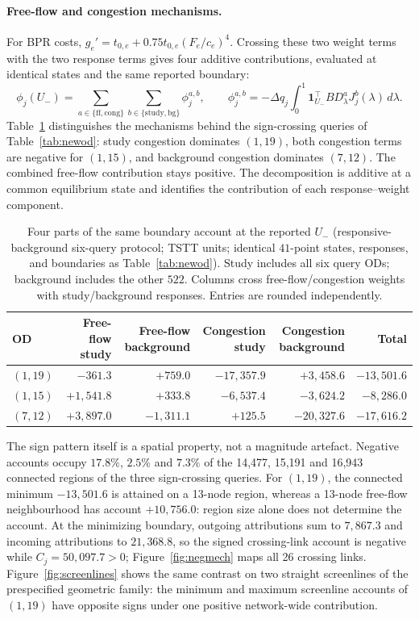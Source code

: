 \paragraph{Free-flow and congestion mechanisms.}\label{subsec:newod}
For BPR costs, $g_e'=t_{0,e}+0.75t_{0,e}(F_e/c_e)^4$. Crossing these two weight terms with the two response terms gives four additive contributions, evaluated at identical states and the same reported boundary:
\[
\phi_j(U_-)=\sum_{a\in\{\mathrm{ff,cong}\}}\sum_{b\in\{\mathrm{study,bg}\}}\phi_j^{a,b},
\qquad \phi_j^{a,b}=-\Delta q_j\int_0^1\mathbf1_{U_-}^{\top}BD_\lambda^aJ_j^b(\lambda)\,d\lambda.
\]
Table~\ref{tab:ffcong} distinguishes the mechanisms behind the sign-crossing queries of Table~\ref{tab:newod}: study congestion dominates $(1,19)$, both congestion terms are negative for $(1,15)$, and background congestion dominates $(7,12)$. The combined free-flow contribution stays positive. The decomposition is additive at a common equilibrium state and identifies the contribution of each response--weight component.
\begin{table}[pos=htbp]
\caption{Four parts of the same boundary account at the reported
$U_-$ (responsive-background six-query protocol; TSTT units; identical $41$-point
states, responses, and boundaries as Table~\ref{tab:newod}). Study
includes all six query ODs; background includes the other $522$.
Columns cross free-flow/congestion weights with study/background
responses. Entries are rounded independently.}\label{tab:ffcong}
\small
\begin{tabular*}{\tblwidth}{@{\extracolsep{\fill}}lrrrrr}
\toprule
OD & Free-flow study & Free-flow background & Congestion study & Congestion background & Total\\
\midrule
$(1,19)$ & $-361.3$ & $+759.0$ & $-17{,}357.9$ & $+3{,}458.6$ & $-13{,}501.6$ \\
$(1,15)$ & $+1{,}541.8$ & $+333.8$ & $-6{,}537.4$ & $-3{,}624.2$ & $-8{,}286.0$ \\
$(7,12)$ & $+3{,}897.0$ & $-1{,}311.1$ & $+125.5$ & $-20{,}327.6$ & $-17{,}616.2$ \\
\bottomrule
\end{tabular*}
\end{table}
The sign pattern itself is a spatial property, not a magnitude artefact. Negative accounts occupy $17.8\%$, $2.5\%$ and $7.3\%$ of the 14,477, 15,191 and 16,943 connected regions of the three sign-crossing queries. For $(1,19)$, the connected minimum $-13{,}501.6$ is attained on a 13-node region, whereas a 13-node free-flow neighbourhood has account $+10{,}756.0$: region size alone does not determine the account. At the minimizing boundary, outgoing attributions sum to $7{,}867.3$ and incoming attributions to $21{,}368.8$, so the signed crossing-link account is negative while $C_j=50{,}097.7>0$; Figure~\ref{fig:negmech} maps all 26 crossing links. Figure~\ref{fig:screenlines} shows the same contrast on two straight screenlines of the prespecified geometric family: the minimum and maximum screenline accounts of $(1,19)$ have opposite signs under one positive network-wide contribution.
